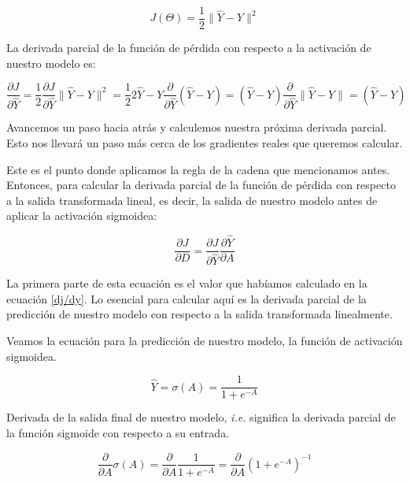 \documentclass[14.5pt,a4paper]{article}
\begin{document}
\begin{equation}
J(\Theta)=\frac{1}{2} \|\hat{Y}-Y\|^2
\end{equation}

La derivada parcial de la función de pérdida con respecto a la activación de nuestro modelo es:

\begin{equation}
\frac{\partial J}{\partial \hat{Y}}
=\frac{1}{2} \frac{\partial J}{\partial \hat{Y}} \|\hat{Y}-Y\|^2 = \frac{1}{2} 2 \hat{Y} - Y \frac{\partial}{\partial \hat{Y}} (\hat{Y}-Y) = (\hat{Y}-Y) \frac{\partial}{\partial \hat{Y}} \|\hat{Y}-Y\| = (\hat{Y} - Y)
\label{dj/dy}
\end{equation}

Avancemos un paso hacia atrás y calculemos nuestra próxima derivada parcial. Esto nos llevará un paso más cerca de los gradientes reales que queremos calcular.

Este es el punto donde aplicamos la regla de la cadena que mencionamos antes. Entonces, para calcular la derivada parcial de la función de pérdida con respecto a la salida transformada lineal, es decir, la salida de nuestro modelo antes de aplicar la activación sigmoidea:

\begin{equation}
\frac{\partial J}{\partial D} = \frac{\partial J}{\partial \hat{Y}} \frac{\partial \hat{Y}}{\partial A}
\label{dJdD}
\end{equation}

La primera parte de esta ecuación es el valor que habíamos calculado en la ecuación \ref{dj/dy}. Lo esencial para calcular aquí es la derivada parcial de la predicción de nuestro modelo con respecto a la salida transformada linealmente.

Veamos la ecuación para la predicción de nuestro modelo, la función de activación sigmoidea.

\begin{equation}
\hat{Y} = \sigma(A) = \frac{1}{1+e^{-A}}
\end{equation}

Derivada de la salida final de nuestro modelo, \textit{i.e.} significa la derivada parcial de la función sigmoide con respecto a su entrada.

\begin{equation}
\frac{\partial}{\partial A} \sigma (A) = \frac{\partial}{\partial A} \frac{1}{1+e^{-A}} = \frac{\partial}{\partial A} (1+e^{-A})^{-1}
\end{equation}
\end{document}
